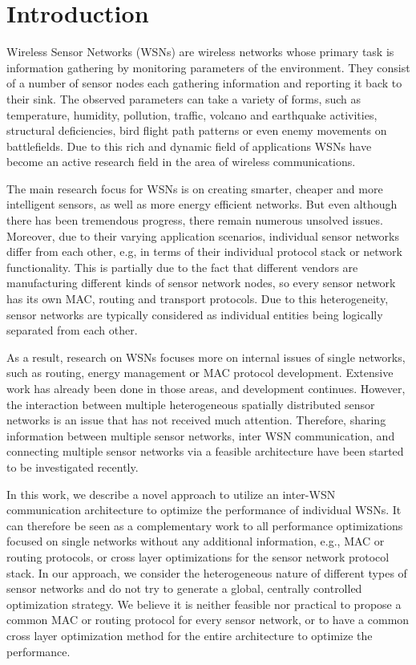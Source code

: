 \documentclass[onecolumn]{jaise2e}
\begin{document}
\section{Introduction}

Wireless Sensor Networks (WSNs) \cite{YiMu08} are wireless networks whose primary task is information gathering by monitoring parameters of the environment. They consist of a number of sensor nodes each gathering information and reporting it back to their sink. The observed parameters can take a variety of forms, such as temperature, humidity, pollution, traffic, volcano and earthquake activities, structural deficiencies, bird flight path patterns or even enemy movements on battlefields. Due to this rich and dynamic field of applications WSNs have become an active research field in the area of wireless communications. 

The main research focus for WSNs is on creating smarter, cheaper and more intelligent sensors, as well as more energy efficient networks. But even although there has been tremendous progress, there remain numerous unsolved issues. Moreover, due to their varying application scenarios, individual sensor networks differ from each other, e.g, in terms of their individual protocol stack or network functionality. This is partially due to the fact that different vendors are manufacturing different kinds of sensor network nodes, so every sensor network has its own MAC, routing and transport protocols. Due to this heterogeneity, sensor networks are typically considered as individual entities being logically separated from each other. 

As a result, research on WSNs focuses more on internal issues of single networks, such as routing, energy management or MAC protocol development. Extensive work has already been done in those areas, and development continues. However, the interaction between multiple heterogeneous spatially distributed sensor networks is an issue that has not received much attention. Therefore, sharing information between multiple sensor networks, inter WSN communication, and connecting multiple sensor networks via a feasible architecture have been started to be investigated recently.   

In this work, we describe a novel approach to utilize an inter-WSN communication architecture to optimize the performance of individual WSNs. It can therefore be seen as a complementary work to all performance optimizations focused on single networks without any additional information, e.g., MAC or routing protocols, or cross layer optimizations for the sensor network protocol stack. In our approach, we consider the heterogeneous nature of different types of sensor networks and do not try to generate a global, centrally controlled optimization strategy. We believe it is neither feasible nor practical to propose a common MAC or routing protocol for every sensor network, or to have a common cross layer optimization method for the entire architecture to optimize the performance.
\end{document}
